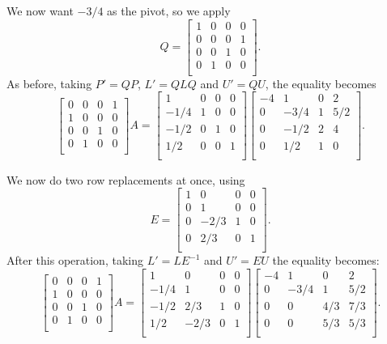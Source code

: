 \documentclass[11pt]{article}
\newcommand{\1}{\mathbf{1}}
\newcommand{\0}{\mathbf{0}}
\begin{document}
We now want $-3/4$ as the pivot, so we apply
\[
Q =
\begin{bmatrix}
  1	&  0	&  0	&  0 \\
  0	&  0	&  0	&  1 \\
  0	&  0	&  1	&  0 \\
  0	&  1	&  0	&  0 \\
\end{bmatrix}
.
\]
As before, taking $P' = Q P$, $L' = Q L Q$ and $U' = QU$, the equality becomes
\[
\begin{bmatrix}
  0	&  0	&  0	&  1 \\
  1	&  0	&  0	&  0 \\
  0	&  0	&  1	&  0 \\
  0	&  1	&  0	&  0 \\
\end{bmatrix}
A
=
\begin{bmatrix}
  1	&  0	&  0	&  0 \\
 -1/4	&  1	&  0	&  0 \\
 -1/2	&  0	&  1	&  0 \\
  1/2	&  0	&  0	&  1 \\
\end{bmatrix}
\begin{bmatrix}
 -4	&  1	&  0	&  2 \\
  0	& -3/4	&  1	&  5/2 \\
  0	& -1/2	&  2	&  4 \\
  0	&  1/2	&  1	&  0 \\
\end{bmatrix}
.
\]

We now do two row replacements at once, using
\[
E =
\begin{bmatrix}
  1	&  0	&  0	&  0 \\
  0	&  1	&  0	&  0 \\
  0	& -2/3	&  1	&  0 \\
  0	&  2/3	&  0	&  1 \\
\end{bmatrix}
.
\]
After this operation, taking $L' = LE^{-1}$ and $U'=EU$ the equality becomes:
\[
\begin{bmatrix}
  0	&  0	&  0	&  1 \\
  1	&  0	&  0	&  0 \\
  0	&  0	&  1	&  0 \\
  0	&  1	&  0	&  0 \\
\end{bmatrix}
A
=
\begin{bmatrix}
  1	&  0	&  0	&  0 \\
 -1/4	&  1	&  0	&  0 \\
 -1/2	&  2/3	&  1	&  0 \\
  1/2	& -2/3	&  0	&  1 \\
\end{bmatrix}
\begin{bmatrix}
 -4	&  1	&  0	&  2 \\
  0	& -3/4	&  1	&  5/2 \\
  0	&  0	&  4/3	&  7/3 \\
  0	&  0	&  5/3	&  5/3 \\
\end{bmatrix}
.
\]
\end{document}
